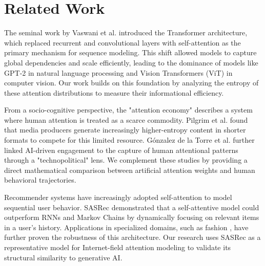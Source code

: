 \section{Related Work}
\label{sec:related}

 The seminal work by Vaswani et al. \cite{vaswani2017attention} introduced the Transformer architecture, which replaced recurrent and convolutional layers with self-attention as the primary mechanism for sequence modeling. This shift allowed models to capture global dependencies and scale efficiently, leading to the dominance of models like GPT-2 \cite{radford2019language} in natural language processing and Vision Transformers (ViT) \cite{dosovitskiy2021image} in computer vision. Our work builds on this foundation by analyzing the entropy of these attention distributions to measure their informational efficiency.

 From a socio-cognitive perspective, the "attention economy" describes a system where human attention is treated as a scarce commodity. Pilgrim et al. \cite{pilgrim2021rising} found that media producers generate increasingly higher-entropy content in shorter formats to compete for this limited resource. G{\'o}nzalez de la Torre et al. \cite{gonzalez2024attention} further linked AI-driven engagement to the capture of human attentional patterns through a "technopolitical" lens. We complement these studies by providing a direct mathematical comparison between artificial attention weights and human behavioral trajectories.

 Recommender systems have increasingly adopted self-attention to model sequential user behavior. SASRec \cite{kang2018self} demonstrated that a self-attentive model could outperform RNNs and Markov Chains by dynamically focusing on relevant items in a user's history. Applications in specialized domains, such as fashion \cite{reusable2022fashion}, have further proven the robustness of this architecture. Our research uses SASRec as a representative model for Internet-field attention modeling to validate its structural similarity to generative AI.
